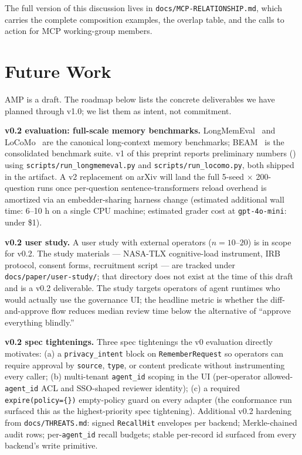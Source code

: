 \documentclass[11pt,letterpaper,twocolumn]{article}
\begin{document}
The full version of this discussion lives in \texttt{docs/MCP-RELATIONSHIP.md}, which carries the complete composition examples, the overlap table, and the calls to action for MCP working-group members.

\section{Future Work}
\label{sec:future}

AMP is a draft. The roadmap below lists the concrete deliverables we have planned through v1.0; we list them as intent, not commitment.

\textbf{v0.2 evaluation: full-scale memory benchmarks.} LongMemEval~\cite{wu2024longmemeval} and LoCoMo~\cite{maharana2024locomo} are the canonical long-context memory benchmarks; BEAM~\cite{beam_benchmark} is the consolidated benchmark suite. v1 of this preprint reports preliminary numbers () using \texttt{scripts/run\_longmemeval.py} and \texttt{scripts/run\_locomo.py}, both shipped in the artifact. A v2 replacement on arXiv will land the full 5-seed $\times$ 200-question runs once per-question sentence-transformers reload overhead is amortized via an embedder-sharing harness change (estimated additional wall time: 6--10 h on a single CPU machine; estimated grader cost at \texttt{gpt-4o-mini}: under \$1).

\textbf{v0.2 user study.} A user study with external operators ($n=10$--$20$) is in scope for v0.2. The study materials --- NASA-TLX cognitive-load instrument, IRB protocol, consent forms, recruitment script --- are tracked under \texttt{docs/paper/user-study/}; that directory does not exist at the time of this draft and is a v0.2 deliverable. The study targets operators of agent runtimes who would actually use the governance UI; the headline metric is whether the diff-and-approve flow reduces median review time below the alternative of ``approve everything blindly.''

\textbf{v0.2 spec tightenings.} Three spec tightenings the v0 evaluation directly motivates: (a) a \texttt{privacy\_intent} block on \texttt{RememberRequest} so operators can require approval by \texttt{source}, \texttt{type}, or content predicate without instrumenting every caller; (b) multi-tenant \texttt{agent\_id} scoping in the UI (per-operator allowed-\texttt{agent\_id} ACL and SSO-shaped reviewer identity); (c) a required \texttt{expire(policy=\{\})} empty-policy guard on every adapter (the  conformance run surfaced this as the highest-priority spec tightening). Additional v0.2 hardening from \texttt{docs/THREATS.md}: signed \texttt{RecallHit} envelopes per backend; Merkle-chained audit rows; per-\texttt{agent\_id} recall budgets; stable per-record id surfaced from every backend's write primitive.
\end{document}
